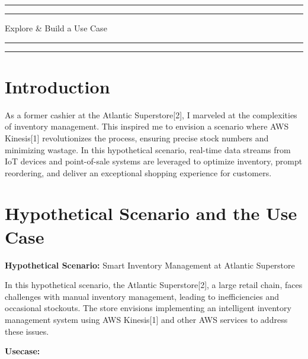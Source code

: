 
\newpage

\begin{flushright}
    \vspace{10cm}
    \rule{18cm}{5pt}
    \rule{18cm}{2pt}\vskip1cm
    \begin{center}
    \begin{bfseries}
        \Huge{Explore \& Build a Use Case}\\
    \end{bfseries}
    \end{center}
    \vspace{1cm}
    \rule{18cm}{2pt}
    \rule{18cm}{5pt}
\end{flushright}
\clearpage
\chapter{Introduction}
As a former cashier at the Atlantic Superstore[2], I marveled at the complexities of inventory management. This inspired me to envision a scenario where AWS Kinesis[1] revolutionizes the process, ensuring precise stock numbers and minimizing wastage. In this hypothetical scenario, real-time data streams from IoT devices and point-of-sale systems are leveraged to optimize inventory, prompt reordering, and deliver an exceptional shopping experience for customers.
 \let\clearpage\relax
\chapter{Hypothetical Scenario and the Use Case}

\textbf{Hypothetical Scenario:} Smart Inventory Management at Atlantic Superstore
\newline

In this hypothetical scenario, the Atlantic Superstore[2], a large retail chain, faces challenges with manual inventory management, leading to inefficiencies and occasional stockouts. The store envisions implementing an intelligent inventory management system using AWS Kinesis[1] and other AWS services to address these issues.
\newline

\textbf{Usecase:}
\newline


